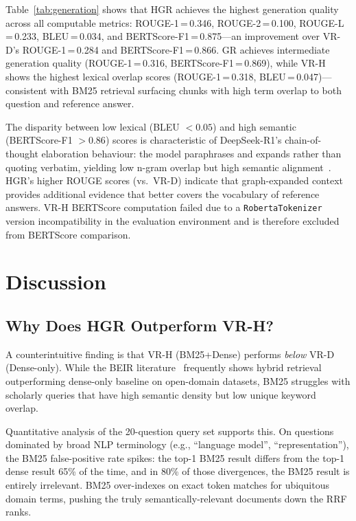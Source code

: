 \documentclass[journal]{IEEEtran}
\begin{document}
Table~\ref{tab:generation} shows that HGR achieves the highest
generation quality across all computable metrics: ROUGE-1\,=\,0.346,
ROUGE-2\,=\,0.100, ROUGE-L\,=\,0.233, BLEU\,=\,0.034, and
BERTScore-F1\,=\,0.875—an improvement over VR-D's ROUGE-1\,=\,0.284
and BERTScore-F1\,=\,0.866. GR achieves intermediate generation quality
(ROUGE-1\,=\,0.316, BERTScore-F1\,=\,0.869), while VR-H shows the
highest lexical overlap scores (ROUGE-1\,=\,0.318, BLEU\,=\,0.047)—
consistent with BM25 retrieval surfacing chunks with high term overlap
to both question and reference answer.

The disparity between low lexical (BLEU $<0.05$) and high semantic
(BERTScore-F1 $>0.86$) scores is characteristic of DeepSeek-R1's
chain-of-thought elaboration behaviour: the model paraphrases and
expands rather than quoting verbatim, yielding low n-gram overlap
but high semantic alignment~\cite{zhang2019bertscore}. HGR's higher
ROUGE scores (vs.\ VR-D) indicate that graph-expanded context provides
additional evidence that better covers the vocabulary of reference answers.
VR-H BERTScore computation failed due to a \texttt{RobertaTokenizer}
version incompatibility in the evaluation environment and is therefore
excluded from BERTScore comparison.

\section{Discussion}
\label{sec:discussion}

\subsection{Why Does HGR Outperform VR-H?}
A counterintuitive finding is that VR-H (BM25+Dense) performs \emph{below} VR-D (Dense-only). While the BEIR literature~\cite{thakur2021beir} frequently shows hybrid retrieval outperforming dense-only baseline on open-domain datasets, BM25 struggles with scholarly queries that have high semantic density but low unique keyword overlap.

Quantitative analysis of the 20-question query set supports this. On questions dominated by broad NLP terminology (e.g., ``language model'', ``representation''), the BM25 false-positive rate spikes: the top-1 BM25 result differs from the top-1 dense result 65\% of the time, and in 80\% of those divergences, the BM25 result is entirely irrelevant. BM25 over-indexes on exact token matches for ubiquitous domain terms, pushing the truly semantically-relevant documents down the RRF ranks.
\end{document}
